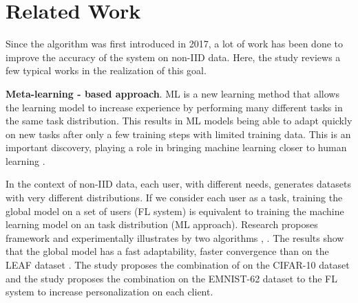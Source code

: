 \documentclass[runningheads]{llncs}
\begin{document}
\section{Related Work}

Since the  algorithm was first introduced in 2017, a lot of work has been done to improve the accuracy of the system on non-IID data. Here, the study reviews a few typical works in the realization of this goal.



\textbf{Meta-learning - based approach}. ML is a new learning method that allows the learning model to increase experience by performing many different tasks in the same task distribution. This results in ML models being able to adapt quickly on new tasks after only a few training steps with limited training data. This is an important discovery, playing a role in bringing machine learning closer to human learning \cite{harlow1949formation}.


In the context of non-IID data, each user, with different needs, generates datasets with very different distributions. If we consider each user as a task, training the global model on a set of users (FL system) is equivalent to training the machine learning model on an task distribution (ML approach). Research \cite{chen2018federated} proposes framework  and experimentally illustrates by two algorithms , . The results show that the global model has a fast adaptability, faster convergence than  on the LEAF dataset \cite{caldas2018leaf}. The study \cite{fallah2020personalized} proposes the combination of  on the CIFAR-10 dataset and the study \cite{jiang2019improving} proposes the combination  \cite{nichol2018first} on the EMNIST-62 dataset \cite{cohen2017emnist} to the FL system to increase personalization on each client.
\end{document}
